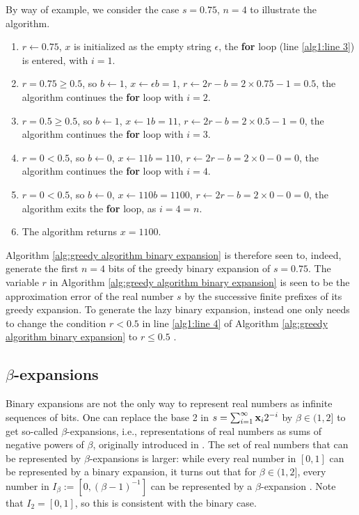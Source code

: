 \noindent By way of example, we consider the case $s = 0.75$, $n = 4$ to illustrate the algorithm.
  \begin{enumerate}[label=(\arabic*)]
      \item $r \gets 0.75$, $x$ is initialized as the empty string $\epsilon$, the \textbf{for} loop (line \ref{alg1:line 3}) is entered, with $i=1$.
      \item $r =0.75 \geq 0.5$, so $b \gets 1$, $x \gets \epsilon b = 1$, $r \gets 2 r -  b = 2 \times 0.75 - 1 = 0.5$, the algorithm continues the \textbf{for} loop with $i = 2$.
      \item $r = 0.5 \geq 0.5$, so $b \gets 1$, $x \gets 1 b = 11$, $r \gets 2 r - b = 2\times 0.5 - 1 = 0$, the algorithm continues the \textbf{for} loop with $i = 3$.
      \item $r = 0 < 0.5$, so $b \gets 0$, $x \gets 11 b = 110$, $r \gets 2 r - b = 2\times 0 - 0 = 0$,  the algorithm continues the \textbf{for} loop with $i = 4$.
      \item $r = 0 < 0.5$, so $b \gets 0$, $x \gets 110 b = 1100$, $r \gets 2 r - b = 2\times 0 - 0 = 0$, the algorithm exits the \textbf{for} loop, as $i = 4 = n$.
      \item The algorithm returns $x = 1100$.
  \end{enumerate}
Algorithm \ref{alg:greedy algorithm binary expansion} is therefore seen to, indeed, generate the first $n=4$ bits of the greedy binary expansion of $s=0.75$. The variable $r$ in Algorithm \ref{alg:greedy algorithm binary expansion} is seen to be the approximation error of the real number $s$ by the successive finite prefixes of its greedy expansion. To generate the lazy binary expansion, instead one only needs to change the condition $r < 0.5$ in line \ref{alg1:line 4} of Algorithm \ref{alg:greedy algorithm binary expansion} to $r \leq 0.5$ \cite[Section 2]{dajani2002greedy}.
  
\subsection{\texorpdfstring{$\beta$-expansions}{}}

\label{sec:beta expansions}
  
Binary expansions are not the only way to represent real numbers as infinite sequences of bits. One can replace the base 2 in $s = \sum_{i=1}^\infty {\bf x}_i 2^{-i}$ by $\beta \in (1,2]$ to get so-called $\beta$-expansions, i.e., representations of real numbers as sums of negative powers of $\beta$, originally introduced in \cite[Section 4, Example 4]{renyi1957representations}. The set of real numbers that can be represented by $\beta$-expansions is larger: while every real number in $[0,1]$ can be represented by a binary expansion, it turns out that for $\beta \in (1,2]$, every number in $I_\beta := [0, (\beta-1)^{-1}]$ can be represented by a $\beta$-expansion \cite[Section 1]{dajani2002greedy}. Note that $I_2 = [0,1]$, so this is consistent with the binary case. 

